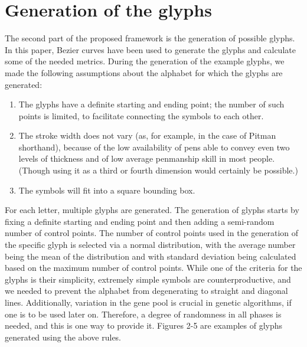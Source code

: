 \documentclass[conference]{IEEEtran}
\begin{document}
\section{Generation of the glyphs}
The second part of the proposed framework is the generation of possible glyphs. In this paper, Bezier curves have been used to generate the glyphs and calculate some of the needed metrics.
During the generation of the example glyphs, we made the following assumptions about the alphabet for which the glyphs are generated:
\begin{enumerate}
        \item The glyphs have a definite starting and ending point; the number of such points is limited, to facilitate connecting the symbols to each other.
        \item The stroke width does not vary (as, for example, in the case of Pitman shorthand), because of the low availability of pens able to convey even two levels of thickness and of low average penmanship skill in most people. (Though using it as a third or fourth dimension would certainly be possible.)
        \item The symbols will fit into a square bounding box.
\end{enumerate}
For each letter, multiple glyphs are generated. The generation of glyphs starts by fixing a definite starting and ending point and then adding a semi-random number of control points. The number of control points used in the generation of the specific glyph is selected via a normal distribution, with the average number being the mean of the distribution and with standard deviation being calculated based on the maximum number of control points. While one of the criteria for the glyphs is their
simplicity, extremely simple symbols are counterproductive, and we needed to prevent the alphabet from degenerating to straight and diagonal lines. Additionally, variation in the gene pool is crucial in genetic algorithms, if one is to be used later on. Therefore, a degree of randomness in all phases is needed, and this is one way to provide it. Figures 2-5 are examples of glyphs generated using the above rules.
\end{document}
